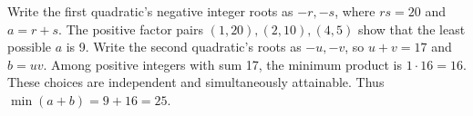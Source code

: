 Write the first quadratic's negative integer roots as $-r,-s$, where $rs=20$ and $a=r+s$. The positive factor pairs $(1,20),(2,10),(4,5)$ show that the least possible $a$ is 9. Write the second quadratic's roots as $-u,-v$, so $u+v=17$ and $b=uv$. Among positive integers with sum 17, the minimum product is $1\cdot16=16$. These choices are independent and simultaneously attainable. Thus $\min(a+b)=9+16=\boxed{25}$.

